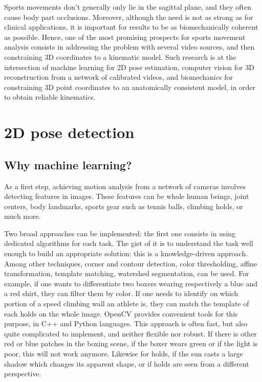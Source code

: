 Sports movements don’t generally only lie in the sagittal plane, and they often cause body part occlusions. Moreover, although the need is not as strong as for clinical applications, it is important for results to be as biomechanically coherent as possible. Hence, one of the most promising prospects for sports movement analysis consists in addressing the problem with several video sources, and then constraining 3D coordinates to a kinematic model.  Such research is at the intersection of machine learning for 2D pose estimation, computer vision for 3D reconstruction from a network of calibrated videos, and biomechanics for constraining 3D point coordinates to an anatomically consistent model, in order to obtain reliable kinematics. 


\section{2D pose detection}

\subsection{Why machine learning?}

As a first step, achieving motion analysis from a network of cameras involves detecting features in images. These features can be whole human beings, joint centers, body landmarks, sports gear such as tennis balls, climbing holds, or much more. 

Two broad approaches can be implemented: the first one consists in using dedicated algorithms for each task. The gist of it is to understand the task well enough to build an appropriate solution: this is a knowledge-driven approach. Among other techniques, corner and contour detection, color thresholding, affine transformation, template matching, watershed segmentation, can be used. For example, if one wants to differentiate two boxers wearing respectively a blue and a red shirt, they can filter them by color. If one needs to identify on which portion of a speed climbing wall an athlete is, they can match the template of each holds on the whole image. OpenCV \cite{Bradski2000} provides convenient tools for this purpose, in C++ and Python languages. This approach is often fast, but also quite complicated to implement, and neither flexible nor robust. If there is other red or blue patches in the boxing scene, if the boxer wears green or if the light is poor, this will not work anymore. Likewise for holds, if the sun casts a large shadow which changes its apparent shape, or if holds are seen from a different perspective.

